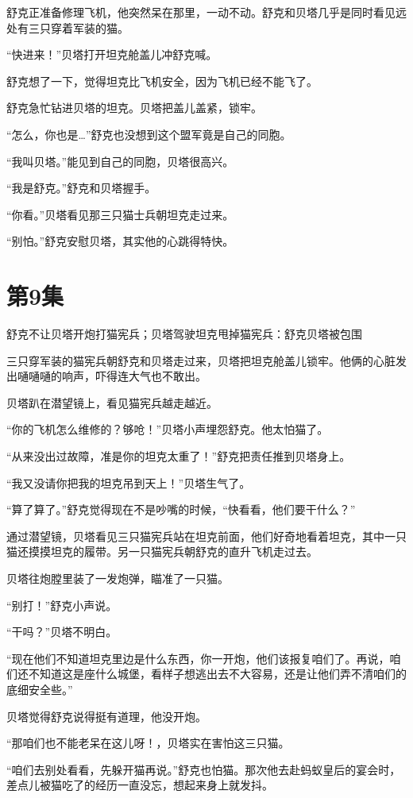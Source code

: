 \documentclass[a4paper,12pt,UTF8,twoside]{ctexbook}
\begin{document}
舒克正准备修理飞机，他突然呆在那里，一动不动。舒克和贝塔几乎是同时看见远处有三只穿着军装的猫。

“快进来！”贝塔打开坦克舱盖儿冲舒克喊。

舒克想了一下，觉得坦克比飞机安全，因为飞机已经不能飞了。

舒克急忙钻进贝塔的坦克。贝塔把盖儿盖紧，锁牢。

“怎么，你也是…”舒克也没想到这个盟军竟是自己的同胞。

“我叫贝塔。”能见到自己的同胞，贝塔很高兴。

“我是舒克。”舒克和贝塔握手。

“你看。”贝塔看见那三只猫士兵朝坦克走过来。

“别怕。”舒克安慰贝塔，其实他的心跳得特快。

\chapter{第9集}

舒克不让贝塔开炮打猫宪兵；贝塔驾驶坦克甩掉猫宪兵：舒克贝塔被包围

三只穿军装的猫宪兵朝舒克和贝塔走过来，贝塔把坦克舱盖儿锁牢。他俩的心脏发出嗵嗵嗵的响声，吓得连大气也不敢出。

贝塔趴在潜望镜上，看见猫宪兵越走越近。

“你的飞机怎么维修的？够呛！”贝塔小声埋怨舒克。他太怕猫了。

“从来没出过故障，准是你的坦克太重了！”舒克把责任推到贝塔身上。

“我又没请你把我的坦克吊到天上！”贝塔生气了。

“算了算了。”舒克觉得现在不是吵嘴的时候，“快看看，他们要干什么？”

通过潜望镜，贝塔看见三只猫宪兵站在坦克前面，他们好奇地看着坦克，其中一只猫还摸摸坦克的履带。另一只猫宪兵朝舒克的直升飞机走过去。

贝塔往炮膛里装了一发炮弹，瞄准了一只猫。

“别打！”舒克小声说。

“干吗？”贝塔不明白。

“现在他们不知道坦克里边是什么东西，你一开炮，他们该报复咱们了。再说，咱们还不知道这是座什么城堡，看样子想逃出去不大容易，还是让他们弄不清咱们的底细安全些。”

贝塔觉得舒克说得挺有道理，他没开炮。

“那咱们也不能老呆在这儿呀！，贝塔实在害怕这三只猫。

“咱们去别处看看，先躲开猫再说。”舒克也怕猫。那次他去赴蚂蚁皇后的宴会时，差点儿被猫吃了的经历一直没忘，想起来身上就发抖。
\end{document}
